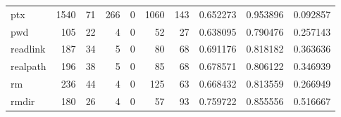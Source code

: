 \begin{longtable}{lrrrrrrrrr}
ptx       &                                               1540 &                                                 71 &                                                266 &                                                  0 &                                               1060 &                                                143 &                                           0.652273 &                               0.953896 &                             0.092857 \\
pwd       &                                                105 &                                                 22 &                                                  4 &                                                  0 &                                                 52 &                                                 27 &                                           0.638095 &                               0.790476 &                             0.257143 \\
readlink  &                                                187 &                                                 34 &                                                  5 &                                                  0 &                                                 80 &                                                 68 &                                           0.691176 &                               0.818182 &                             0.363636 \\
realpath  &                                                196 &                                                 38 &                                                  5 &                                                  0 &                                                 85 &                                                 68 &                                           0.678571 &                               0.806122 &                             0.346939 \\
rm        &                                                236 &                                                 44 &                                                  4 &                                                  0 &                                                125 &                                                 63 &                                           0.668432 &                               0.813559 &                             0.266949 \\
rmdir     &                                                180 &                                                 26 &                                                  4 &                                                  0 &                                                 57 &                                                 93 &                                           0.759722 &                               0.855556 &                             0.516667 \\

\end{longtable}
